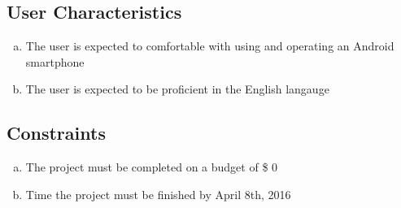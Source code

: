 \documentclass[]{article}
\begin{document}
\subsection{User Characteristics}
\label{sub:user_characteristics}
\begin{enumerate}[a)]
	\item The user is expected to comfortable with using and operating an Android smartphone
	\item The user is expected to be proficient in the English langauge
\end{enumerate}
\cbend

\subsection{Constraints}
\label{sub:constraints}
\begin{enumerate}[a)]
    \item The project must be completed on a budget of \$ 0
    \item Time the project must be finished by April 8th, 2016
\end{enumerate}
\end{document}
